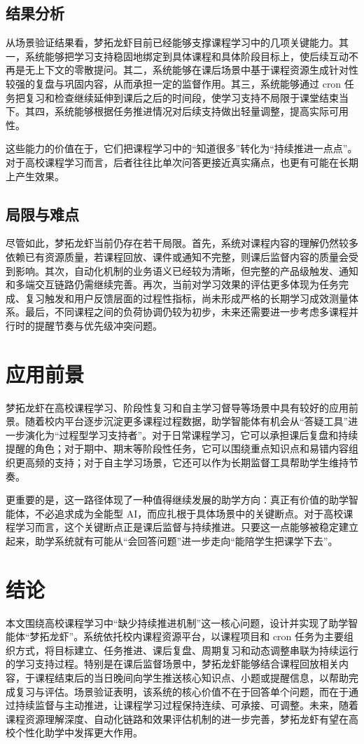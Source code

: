 \documentclass[zihao=-4]{ctexart}
\begin{document}
\subsection{结果分析}
从场景验证结果看，梦拓龙虾目前已经能够支撑课程学习中的几项关键能力。其一，系统能够把学习支持稳固地绑定到具体课程和具体阶段目标上，使后续互动不再是无上下文的零散提问。其二，系统能够在课后场景中基于课程资源生成针对性较强的复盘与巩固内容，从而承担一定的监督作用。其三，系统能够通过 cron 任务把复习和检查继续延伸到课后之后的时间段，使学习支持不局限于课堂结束当下。其四，系统能够根据任务推进情况对后续支持做出轻量调整，提高实际可用性。

这些能力的价值在于，它们把课程学习中的“知道很多”转化为“持续推进一点点”。对于高校课程学习而言，后者往往比单次问答更接近真实痛点，也更有可能在长期上产生效果。

\subsection{局限与难点}
尽管如此，梦拓龙虾当前仍存在若干局限。首先，系统对课程内容的理解仍然较多依赖已有资源质量，若课程回放、课件或通知不完整，则课后监督内容的质量会受到影响。其次，自动化机制的业务语义已经较为清晰，但完整的产品级触发、通知和多端交互链路仍需继续完善。再次，当前对学习效果的评估更多体现为任务完成、复习触发和用户反馈层面的过程性指标，尚未形成严格的长期学习成效测量体系。最后，不同课程之间的负荷协调仍较为初步，未来还需要进一步考虑多课程并行时的提醒节奏与优先级冲突问题。

\section{应用前景}
梦拓龙虾在高校课程学习、阶段性复习和自主学习督导等场景中具有较好的应用前景。随着校内平台逐步沉淀更多课程过程数据，助学智能体有机会从“答疑工具”进一步演化为“过程型学习支持者”。对于日常课程学习，它可以承担课后复盘和持续提醒的角色；对于期中、期末等阶段性任务，它可以围绕重点知识点和易错内容组织更高频的支持；对于自主学习场景，它还可以作为长期监督工具帮助学生维持节奏。

更重要的是，这一路径体现了一种值得继续发展的助学方向：真正有价值的助学智能体，不必追求成为全能型 AI，而应扎根于具体场景中的关键断点。对于高校课程学习而言，这个关键断点正是课后监督与持续推进。只要这一点能够被稳定建立起来，助学系统就有可能从“会回答问题”进一步走向“能陪学生把课学下去”。

\section*{结论}
本文围绕高校课程学习中“缺少持续推进机制”这一核心问题，设计并实现了助学智能体“梦拓龙虾”。系统依托校内课程资源平台，以课程项目和 cron 任务为主要组织方式，将目标建立、任务推进、课后复盘、周期复习和动态调整串联为持续运行的学习支持过程。特别是在课后监督场景中，梦拓龙虾能够结合课程回放相关内容，于课程结束后的当日晚间向学生推送核心知识点、小题或提醒信息，以帮助完成复习与评估。场景验证表明，该系统的核心价值不在于回答单个问题，而在于通过持续监督与主动推进，让课程学习过程保持连续、可承接、可调整。未来，随着课程资源理解深度、自动化链路和效果评估机制的进一步完善，梦拓龙虾有望在高校个性化助学中发挥更大作用。

\clearpage

\end{document}
